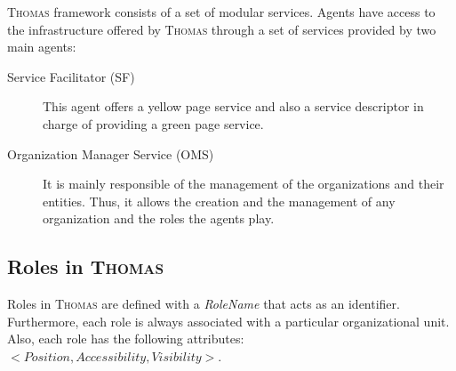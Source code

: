 \textsc{Thomas} framework consists of a set of modular services. Agents have access to the infrastructure offered by \textsc{Thomas} through a set of services provided by two main agents:

\begin{description}
	\item [Service Facilitator (SF)] This agent offers a yellow page service and also a service descriptor in charge of providing a green page service.
	\item [Organization Manager Service (OMS)] It is mainly responsible of the management of the organizations and their entities. Thus, it allows the creation and the management of any organization and the roles the agents play.
\end{description}

\subsection{Roles in \textsc{Thomas}}

Roles  in \textsc{Thomas} are defined with a \textit{RoleName} that acts as an identifier. Furthermore, each role is always associated with a particular organizational unit. Also, each role has the following attributes: $<Position, Accessibility, Visibility>$.

